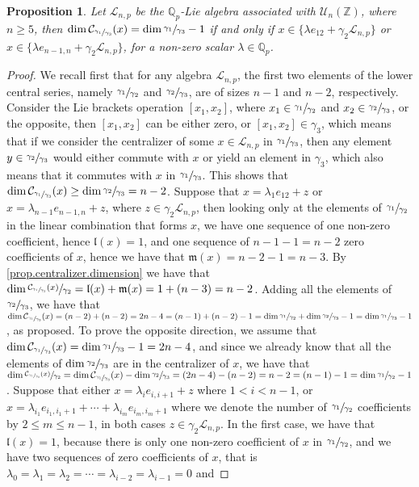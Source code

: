 \documentclass[12pt]{article}
\newtheorem{proposition}[theorem]{Proposition}
\begin{document}
\begin{proposition}
\label{prop.n.geq.5.centralizer.codimension}
Let $\mathcal{L}_{n,p}$ be the $\mathbb{Q}_p$-Lie algebra associated with $\mathcal{U}_n(\mathbb{Z})$, where $n\geq 5$, then $\dim\mathcal{C}_{\sfrac{\gamma_1}{\gamma_3}}(x)=\dim\sfrac{\gamma_1}{\gamma_3}-1$ if and only if $x\in\{\lambda e_{12}+\gamma_2\mathcal{L}_{n,p}\}$ or $x\in\{\lambda e_{n-1,n}+\gamma_2\mathcal{L}_{n,p}\}$, for a non-zero scalar $\lambda\in\mathbb{Q}_p$.
\end{proposition}
\begin{proof}
We recall first that for any algebra $\mathcal{L}_{n,p}$, the first two elements of the lower central series, namely $\sfrac{\gamma_1}{\gamma_2}$ and $\sfrac{\gamma_2}{\gamma_3}$, are of sizes $n-1$ and $n-2$, respectively. Consider the Lie brackets operation $[x_1,x_2]$, where $x_1\in\sfrac{\gamma_1}{\gamma_2}$ and $x_2\in\sfrac{\gamma_2}{\gamma_3}$, or the opposite, then $[x_1,x_2]$ can be either zero, or $[x_1,x_2]\in\gamma_3$, which means that if we consider the centralizer of some $x\in\mathcal{L}_{n,p}$ in $\sfrac{\gamma_1}{\gamma_3}$, then any element $y\in\sfrac{\gamma_2}{\gamma_3}$ would either commute with $x$ or yield an element in $\gamma_3$, which also means that it commutes with $x$ in $\sfrac{\gamma_1}{\gamma_3}$. This shows that $\dim\mathcal{C}_{\sfrac{\gamma_1}{\gamma_3}}(x)\geq\dim\sfrac{\gamma_2}{\gamma_3}=n-2$. Suppose that $x=\lambda_1 e_{12}+z$ or $x=\lambda_{n-1}e_{n-1,n}+z$, where $z\in\gamma_2\mathcal{L}_{n,p}$, then looking only at the elements of $\sfrac{\gamma_1}{\gamma_2}$ in the linear combination that forms $x$, we have one sequence of one non-zero coefficient, hence $\mathfrak{l}(x)=1$, and one sequence of $n-1-1=n-2$ zero coefficients of $x$, hence we have that $\mathfrak{m}(x)=n-2-1=n-3$. By \ref{prop.centralizer.dimension} we have that $\dim\sfrac{\mathcal{C}_{\sfrac{\gamma_1}{\gamma_3}}(x)}{\gamma_2}=\mathfrak{l}(x)+\mathfrak{m}(x)=1+(n-3)=n-2$. Adding all the elements of $\sfrac{\gamma_2}{\gamma_3}$, we have that $\dim\mathcal{C}_{\sfrac{\gamma_1}{\gamma_3}}(x)=(n-2)+(n-2)=2n-4=(n-1)+(n-2)-1=\dim\sfrac{\gamma_1}{\gamma_2}+\dim\sfrac{\gamma_2}{\gamma_3}-1=\dim\sfrac{\gamma_1}{\gamma_3}-1$, as proposed. To prove the opposite direction, we assume that $\dim\mathcal{C}_{\sfrac{\gamma_1}{\gamma_3}}(x)=\dim\sfrac{\gamma_1}{\gamma_3}-1=2n-4$, and since we already know that all the elements of $\dim\sfrac{\gamma_2}{\gamma_3}$ are in the centralizer of $x$, we have that $\dim\sfrac{\mathcal{C}_{\sfrac{\gamma_1}{\gamma_3}}(x)}{\gamma_2}=\dim\mathcal{C}_{\sfrac{\gamma_1}{\gamma_3}}(x)-\dim\sfrac{\gamma_2}{\gamma_3}=(2n-4)-(n-2)=n-2=(n-1)-1=\dim\sfrac{\gamma_1}{\gamma_2}-1$. Suppose that either $x=\lambda_i e_{i,i+1}+z$ where $1<i<n-1$, or $x=\lambda_{i_1}e_{i_1,i_1+1}+\cdots+\lambda_{i_m}e_{i_m,i_m+1}$ where we denote the number of $\sfrac{\gamma_1}{\gamma_2}$ coefficients by $2\leq m\leq n-1$, in both cases $z\in\gamma_2\mathcal{L}_{n,p}$. In the first case, we have that $\mathfrak{l}(x)=1$, because there is only one non-zero coefficient of $x$ in $\sfrac{\gamma_1}{\gamma_2}$, and we have two sequences of zero coefficients of $x$, that is $\lambda_0=\lambda_1=\lambda_2=\cdots=\lambda_{i-2}=\lambda_{i-1}=0$ and 
\end{proof}
\end{document}
